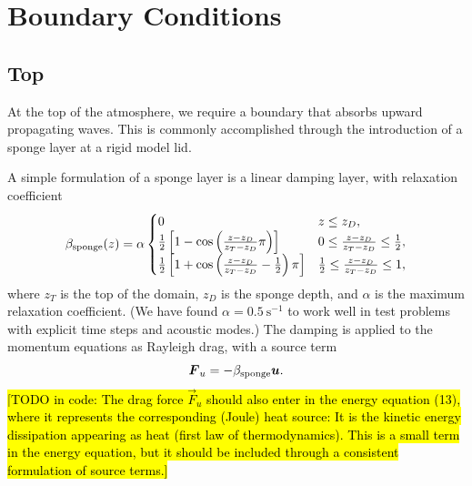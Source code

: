 \documentclass{report}
\begin{document}
\section{Boundary Conditions}\label{sct:bc}

\subsection{Top} 
At the top of the atmosphere, we require a boundary that absorbs upward propagating waves. This is commonly accomplished through the introduction of a sponge layer at a rigid model lid. 

A simple formulation of a sponge layer is a linear damping layer, with relaxation coefficient \citep{durran:1983}
\begin{equation}\label{eq:spongeDurran}
\beta_{\rm sponge}(z) = \alpha
    \begin{cases}
    0 &  z\leq z_D,\\
    \frac{1}{2}\left[1 - \cos\left(\frac{z - z_D}{z_T - z_D}\pi\right) \right] &  0\leq \frac{z - z_D}{z_T - z_D} \leq \frac{1}{2},\\
    \frac{1}{2}\left[1 + \cos\left(\frac{z - z_D}{z_T - z_D} - \frac{1}{2}\right)\pi \right]  &  \frac{1}{2}\leq \frac{z - z_D}{z_T - z_D} \leq 1,\\
    \end{cases}
\end{equation}
where $z_T$ is the top of the domain, $z_D$ is the sponge depth, and $\alpha$ is the maximum relaxation coefficient. (We have found $\alpha = 0.5~\mathrm{s^{-1}}$ to work well in test problems with explicit time steps and acoustic modes.) The damping is applied to the momentum equations as Rayleigh drag, with a source term
\begin{equation*}
\vec{F}_u = -\beta_{\rm sponge} \vec{u}.
\end{equation*}
\hl{[TODO in code: The drag force $\vec{F}_u$ should also enter in the energy equation (13), where it represents the corresponding (Joule) heat source: It is the kinetic energy dissipation appearing as heat (first law of thermodynamics). This is a small term in the energy equation, but it should be included through a consistent formulation of source terms.]} 
\end{document}
